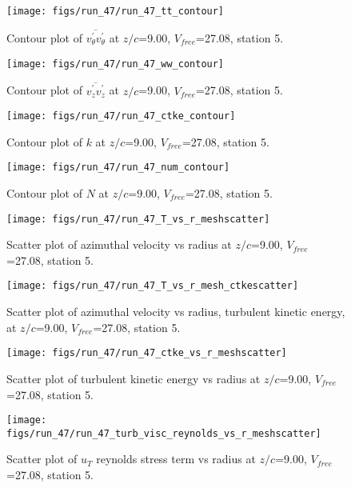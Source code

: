 \begin{figure}[H]
\centering
\texttt{[image: figs/run\_47/run\_47\_tt\_contour]}
\caption{Contour plot of $\overline{v_{\theta}^{\prime} v_{\theta}^{\prime}}$ at $z/c$=9.00, $V_{free}$=27.08, station 5.}
\end{figure}


\begin{figure}[H]
\centering
\texttt{[image: figs/run\_47/run\_47\_ww\_contour]}
\caption{Contour plot of $\overline{v_{z}^{\prime} v_{z}^{\prime}}$ at $z/c$=9.00, $V_{free}$=27.08, station 5.}
\end{figure}


\begin{figure}[H]
\centering
\texttt{[image: figs/run\_47/run\_47\_ctke\_contour]}
\caption{Contour plot of $k$ at $z/c$=9.00, $V_{free}$=27.08, station 5.}
\end{figure}


\begin{figure}[H]
\centering
\texttt{[image: figs/run\_47/run\_47\_num\_contour]}
\caption{Contour plot of $N$ at $z/c$=9.00, $V_{free}$=27.08, station 5.}
\end{figure}


\begin{figure}[H]
\centering
\texttt{[image: figs/run\_47/run\_47\_T\_vs\_r\_meshscatter]}
\caption{Scatter plot of azimuthal velocity vs radius at $z/c$=9.00, $V_{free}$=27.08, station 5.}
\end{figure}


\begin{figure}[H]
\centering
\texttt{[image: figs/run\_47/run\_47\_T\_vs\_r\_mesh\_ctkescatter]}
\caption{Scatter plot of azimuthal velocity vs radius, turbulent kinetic energy, at $z/c$=9.00, $V_{free}$=27.08, station 5.}
\end{figure}


\begin{figure}[H]
\centering
\texttt{[image: figs/run\_47/run\_47\_ctke\_vs\_r\_meshscatter]}
\caption{Scatter plot of turbulent kinetic energy vs radius at $z/c$=9.00, $V_{free}$=27.08, station 5.}
\end{figure}


\begin{figure}[H]
\centering
\texttt{[image: figs/run\_47/run\_47\_turb\_visc\_reynolds\_vs\_r\_meshscatter]}
\caption{Scatter plot of $
u_T$ reynolds stress term vs radius at $z/c$=9.00, $V_{free}$=27.08, station 5.}
\end{figure}


